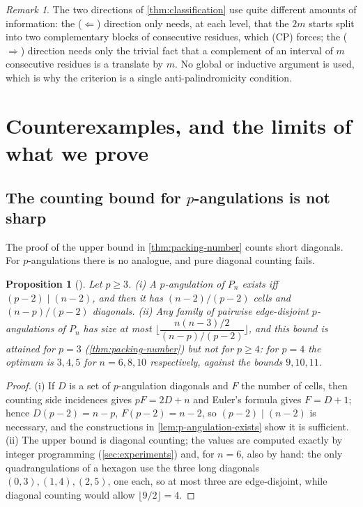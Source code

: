 \documentclass[11pt,a4paper]{article}
\newtheorem{proposition}[theorem]{Proposition}
\theoremstyle{definition}
\theoremstyle{remark}
\newtheorem{remark}[theorem]{Remark}
\begin{document}
\begin{remark}
The two directions of \cref{thm:classification} use quite different amounts of
information: the ($\Leftarrow$) direction only needs, at each level, that the $2m$ starts
split into two complementary blocks of consecutive residues, which (CP) forces; the
($\Rightarrow$) direction needs only the trivial fact that a complement of an interval of $m$
consecutive residues is a translate by $m$.  No global or inductive argument is used, which
is why the criterion is a single anti-palindromicity condition.
\end{remark}

\section{Counterexamples, and the limits of what we prove}\label{sec:limits}

\subsection{The counting bound for $p$-angulations is not sharp}

The proof of the upper bound in \cref{thm:packing-number} counts short diagonals.  For
$p$-angulations there is no analogue, and pure diagonal counting fails.

\begin{proposition}[\label{prop:p-angulations}]
Let $p\ge3$.  (i) A $p$-angulation of $P_n$ exists iff $(p-2)\mid(n-2)$, and then it has
$(n-2)/(p-2)$ cells and $(n-p)/(p-2)$ diagonals.  (ii) Any family of pairwise
edge-disjoint $p$-angulations of $P_n$ has size at most
$\Big\lfloor \dfrac{n(n-3)/2}{(n-p)/(p-2)}\Big\rfloor$, and this bound is attained for
$p=3$ (\cref{thm:packing-number}) but not for $p\ge4$: for $p=4$ the optimum is
$3,4,5$ for $n=6,8,10$ respectively, against the bounds $9,10,11$.
\end{proposition}

\begin{proof}
(i) If $D$ is a set of $p$-angulation diagonals and $F$ the number of cells, then counting
side incidences gives $pF=2D+n$ and Euler's formula gives $F=D+1$; hence $D(p-2)=n-p$,
$F(p-2)=n-2$, so $(p-2)\mid(n-2)$ is necessary, and the constructions in
\cref{lem:p-angulation-exists} show it is sufficient.  (ii) The upper bound is diagonal
counting; the values are computed exactly by integer programming
(\cref{sec:experiments}) and, for $n=6$, also by hand: the only quadrangulations of a
hexagon use the three long diagonals $(0,3),(1,4),(2,5)$, one each, so at most three are
edge-disjoint, while diagonal counting would allow $\lfloor 9/2\rfloor=4$.
\end{proof}
\end{document}
